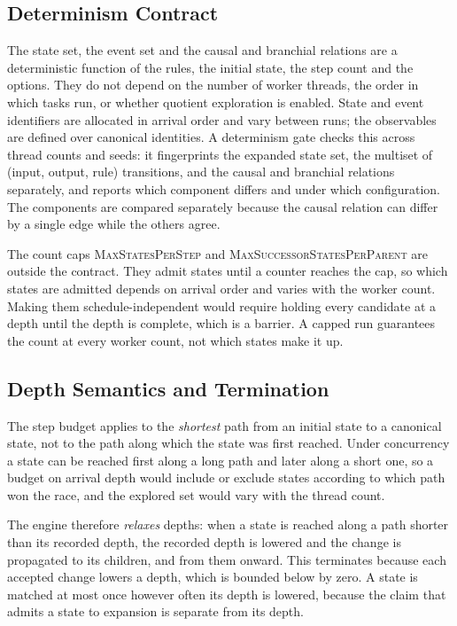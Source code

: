 \subsection{Determinism Contract}
\label{sec:determinism}

The state set, the event set and the causal and branchial relations are a deterministic function of
the rules, the initial state, the step count and the options. They do not depend on the number of
worker threads, the order in which tasks run, or whether quotient exploration is enabled. State and
event identifiers are allocated in arrival order and vary between runs; the observables are defined
over canonical identities. A determinism gate checks this across thread counts and seeds: it
fingerprints the expanded state set, the multiset of (input, output, rule) transitions, and the
causal and branchial relations separately, and reports which component differs and under which
configuration. The components are compared separately because the causal relation can differ by a
single edge while the others agree.

The count caps \textsc{MaxStatesPerStep} and \textsc{MaxSuccessorStatesPerParent} are outside the
contract. They admit states until a counter reaches the cap, so which states are admitted depends
on arrival order and varies with the worker count. Making them schedule-independent would require
holding every candidate at a depth until the depth is complete, which is a barrier. A capped run
guarantees the count at every worker count, not which states make it up.

\subsection{Depth Semantics and Termination}
\label{sec:depth}

The step budget applies to the \emph{shortest} path from an initial state to a canonical state, not
to the path along which the state was first reached. Under concurrency a state can be reached first
along a long path and later along a short one, so a budget on arrival depth would include or exclude
states according to which path won the race, and the explored set would vary with the thread count.

The engine therefore \emph{relaxes} depths: when a state is reached along a path shorter than its
recorded depth, the recorded depth is lowered and the change is propagated to its children, and
from them onward. This terminates because each accepted change lowers a depth, which is bounded
below by zero. A state is matched at most once however often its depth is lowered, because the
claim that admits a state to expansion is separate from its depth.

